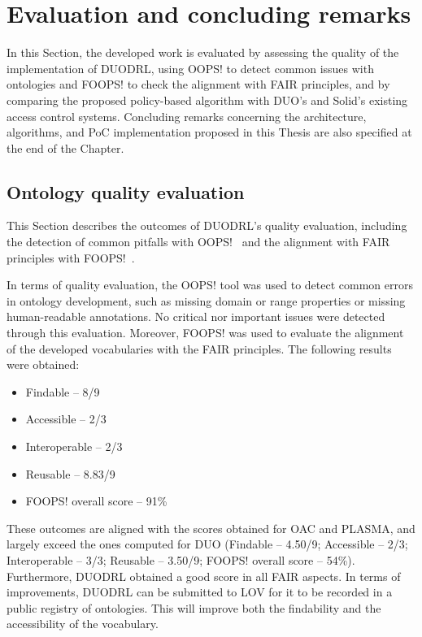 \section{Evaluation and concluding remarks}
\label{sec:evaluation_conclusions}

In this Section, the developed work is evaluated by assessing the quality of the implementation of DUODRL, using OOPS! to detect common issues with ontologies and FOOPS! to check the alignment with FAIR principles, and by comparing the proposed policy-based algorithm with DUO's and Solid's existing access control systems.
Concluding remarks concerning the architecture, algorithms, and PoC implementation proposed in this Thesis are also specified at the end of the Chapter.

\subsection{Ontology quality evaluation}
\label{sec:ontology_evaluation}

This Section describes the outcomes of DUODRL's quality evaluation, including the detection of common pitfalls with OOPS!~\citep{poveda-villalon_oops_2014} and the alignment with FAIR principles with FOOPS!~\citep{garijo_foops_2021}. 

In terms of quality evaluation, the OOPS! tool was used to detect common errors in ontology development, such as missing domain or range properties or missing human-readable annotations.
No critical nor important issues were detected through this evaluation.
Moreover, FOOPS! was used to evaluate the alignment of the developed vocabularies with the FAIR principles.
The following results were obtained:
\begin{itemize}
    \item Findable -- 8/9
    \item Accessible -- 2/3
    \item Interoperable -- 2/3
    \item Reusable -- 8.83/9
    \item FOOPS! overall score -- 91\%
\end{itemize}
These outcomes are aligned with the scores obtained for OAC and PLASMA, and largely exceed the ones computed for DUO (Findable -- 4.50/9; Accessible -- 2/3; Interoperable -- 3/3; Reusable -- 3.50/9; FOOPS! overall score -- 54\%).
Furthermore, DUODRL obtained a good score in all FAIR aspects.
In terms of improvements, DUODRL can be submitted to LOV for it to be recorded in a public registry of ontologies.
This will improve both the findability and the accessibility of the vocabulary.

